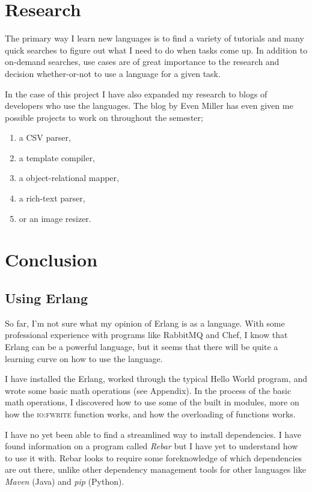 \documentclass[11 pt]{IEEEtran}
\begin{document}
\section{Research}
The primary way I learn new languages is to find a variety of tutorials and many quick searches to figure out what I need to do when tasks come up. In addition to on-demand searches, use cases are of great importance to the research and decision whether-or-not to use a language for a given task. 

In the case of this project I have also expanded my research to blogs of developers who use the languages. The blog by Even Miller has even given me possible projects to work on throughout the semester; 
\begin{enumerate}
\item a CSV parser,
\item a template compiler,
\item a object-relational mapper,
\item  a rich-text parser,
\item  or an image resizer.
\end{enumerate}
 
\section{Conclusion}
\subsection{Using Erlang}
So far, I'm not sure what my opinion of Erlang is as a language. With some professional experience with programs like RabbitMQ and Chef, I know that Erlang can be a powerful language, but it seems that there will be quite a learning curve on how to use the language.

I have installed the Erlang, worked through the typical Hello World program, and wrote some basic math operations (see Appendix). In the process of the basic math operations, I discovered how to use some of the built in modules, more on how the \textsc{io:fwrite} function works, and how the overloading of functions works.

I have no yet been able to find a streamlined way to install dependencies. I have found information on a program called \emph{Rebar} but I have yet to understand how to use it with. Rebar looks to require some foreknowledge of which dependencies are out there, unlike other dependency management tools for other languages like \emph{Maven} (Java) and \emph{pip} (Python).
\end{document}
